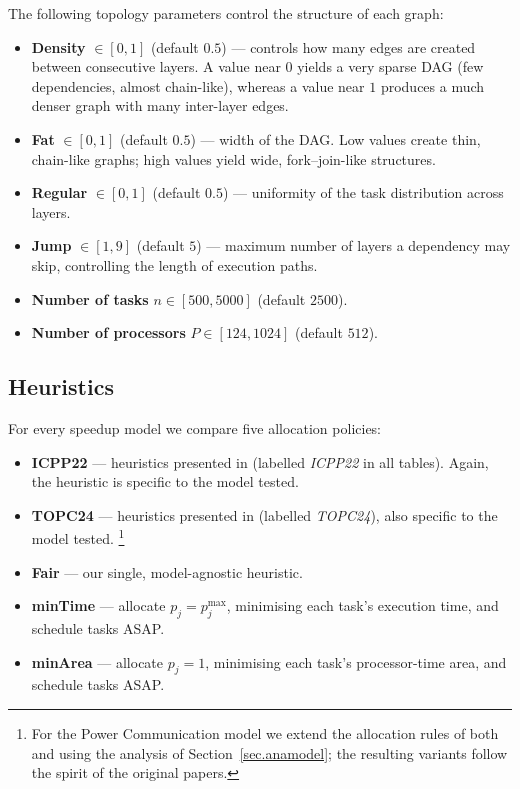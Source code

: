 \documentclass{article}
\begin{document}
The following topology parameters control the structure of each graph:
\begin{itemize}
    \item \textbf{Density} $\in[0,1]$ (default $0.5$) — controls how many edges are created between consecutive layers.
          A value near $0$ yields a very sparse DAG (few dependencies,
          almost chain-like), whereas a value near $1$ produces a much denser
          graph with many inter-layer edges.
    \item \textbf{Fat} $\in[0,1]$ (default $0.5$) — width of the DAG.
          Low values create thin, chain-like graphs; high values yield
          wide, fork–join-like structures.
    \item \textbf{Regular} $\in[0,1]$ (default $0.5$) — uniformity of the task
          distribution across layers.
    \item \textbf{Jump} $\in[1,9]$ (default $5$) — maximum number of layers a
          dependency may skip, controlling the length of execution paths.
    \item \textbf{Number of tasks} $n\in[500,5000]$ (default $2500$).
    \item \textbf{Number of processors} $P\in[124,1024]$ (default $512$).
\end{itemize}

\subsection{Heuristics}
\label{sec:heuristics}

For every speedup model we compare five allocation policies:
\begin{itemize}
    \item \textbf{ICPP22} — heuristics presented in
          \cite{ICPP22} (labelled \emph{ICPP22} in all tables). Again, the heuristic is specific to the model tested.
    \item \textbf{TOPC24} — heuristics presented in
          \cite{TOPC24} (labelled \emph{TOPC24}), also specific to the model tested.
          \footnote{For the Power Communication model we extend the
          allocation rules of both \cite{ICPP22} and \cite{TOPC24} using the
          analysis of Section~\ref{sec.anamodel}; the resulting variants follow
          the spirit of the original papers.}
    \item \textbf{Fair} — our single, model-agnostic heuristic.
    \item \textbf{minTime} — allocate \(p_j=p_j^{\max}\), minimising each
          task’s execution time, and schedule tasks ASAP.
    \item \textbf{minArea} — allocate \(p_j=1\), minimising each
          task’s processor-time area, and schedule tasks ASAP.
\end{itemize}
\end{document}
